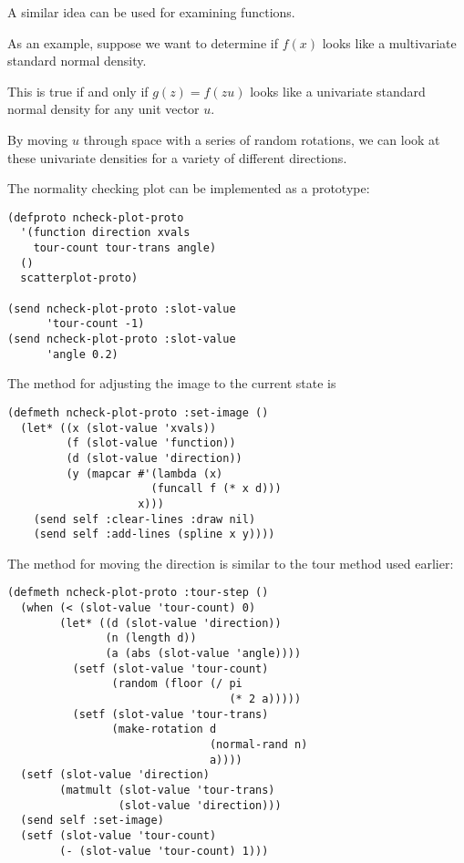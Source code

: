 \begin{slide}{}
A similar idea can be used for examining functions.

As an example, suppose we want to determine if $f(x)$ looks like
a multivariate standard normal density.

This is true if and only if $g(z)=f(zu)$ looks like a univariate
standard normal density for any unit vector $u$.

By moving $u$ through space with a series of random rotations, we can look
at these univariate densities for a variety of different directions.
\end{slide}

\begin{slide}{}
The normality checking plot can be implemented as a prototype:
{\Large
\begin{verbatim}
(defproto ncheck-plot-proto
  '(function direction xvals
    tour-count tour-trans angle)
  ()
  scatterplot-proto)

(send ncheck-plot-proto :slot-value
      'tour-count -1)
(send ncheck-plot-proto :slot-value
      'angle 0.2)
\end{verbatim}}
The method for adjusting the image to the current state is
{\Large
\begin{verbatim}
(defmeth ncheck-plot-proto :set-image ()
  (let* ((x (slot-value 'xvals))
         (f (slot-value 'function))
         (d (slot-value 'direction))
         (y (mapcar #'(lambda (x)
                      (funcall f (* x d)))
                    x)))
    (send self :clear-lines :draw nil)
    (send self :add-lines (spline x y))))
\end{verbatim}}
\end{slide}

\begin{slide}{}
The method for moving the direction is similar to the tour method
used earlier:
{\Large
\begin{verbatim}
(defmeth ncheck-plot-proto :tour-step ()
  (when (< (slot-value 'tour-count) 0)
        (let* ((d (slot-value 'direction))
               (n (length d))
               (a (abs (slot-value 'angle))))
          (setf (slot-value 'tour-count)
                (random (floor (/ pi
                                  (* 2 a)))))
          (setf (slot-value 'tour-trans) 
                (make-rotation d
                               (normal-rand n)
                               a))))
  (setf (slot-value 'direction)
        (matmult (slot-value 'tour-trans)
                 (slot-value 'direction)))
  (send self :set-image)
  (setf (slot-value 'tour-count)
        (- (slot-value 'tour-count) 1)))
\end{verbatim}}
\end{slide}

